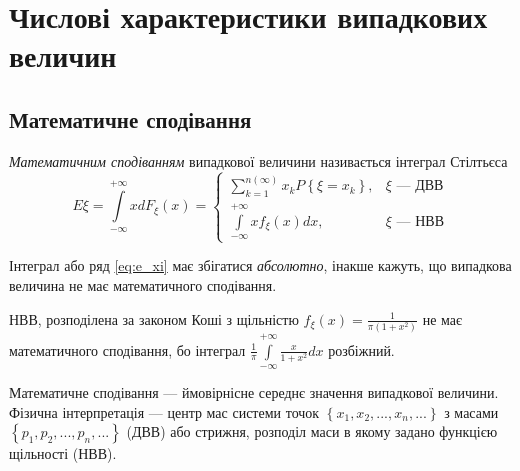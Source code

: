 \section{Числові характеристики випадкових величин}
\subsection{Математичне сподівання}

\begin{definition}
    \emph{Математичним сподіванням} випадкової величини називається
    інтеграл Стілтьєса
    \begin{equation}\label{eq:e_xi}
        E\xi = \int\limits_{-\infty}^{+\infty} x dF_\xi(x) = \begin{cases}
            \sum\limits_{k=1}^{n(\infty)} x_k P\left\{\xi = x_k\right\}, & \xi \text{ --- ДВВ} \\
            \int\limits_{-\infty}^{+\infty} x f_\xi(x)dx, & \xi \text{ --- НВВ}
        \end{cases}
    \end{equation}
\end{definition}
Інтеграл або ряд \eqref{eq:e_xi} має збігатися \emph{абсолютно}, інакше кажуть, що
випадкова величина не має математичного сподівання.
\begin{example}
    НВВ, розподілена за законом Коші з щільністю $f_\xi(x) = \frac{1}{\pi (1+x^2)}$
    не має математичного сподівання, бо інтеграл $\frac{1}{\pi}\int\limits_{-\infty}^{+\infty} \frac{x}{1+x^2}dx$ 
    розбіжний.
\end{example}
Математичне сподівання --- ймовірнісне середнє значення випадкової величини.
Фізична інтерпретація --- центр мас системи точок $\left\{x_1, x_2, ..., x_n,...\right\}$ з масами $\left\{p_1, p_2, ..., p_n, ...\right\}$ (ДВВ) або стрижня,
розподіл маси в якому задано функцією щільності (НВВ).

